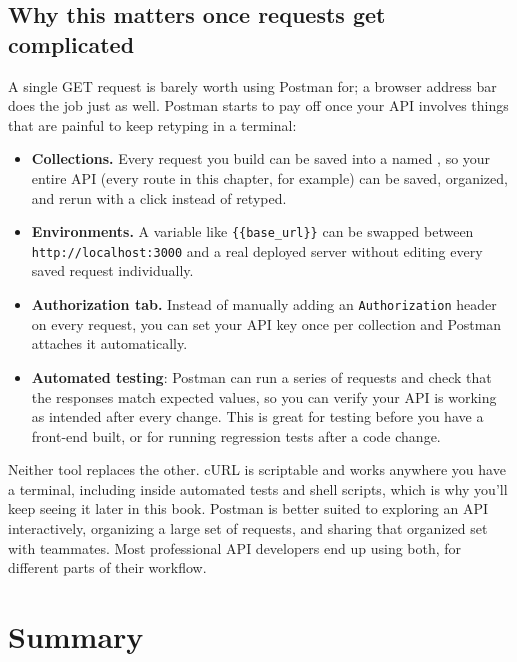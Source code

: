 \subsection{Why this matters once requests get complicated}
 
A single GET request is barely worth using Postman for; a browser
address bar does the job just as well. Postman starts to pay off once
your API involves things that are painful to keep retyping in a
terminal:
 
\begin{itemize}
  \item \textbf{Collections.} Every request you build can be saved into
        a named , so your entire API (every route in
        this chapter, for example) can be saved, organized, and rerun with
        a click instead of retyped.
  \item \textbf{Environments.} A variable like
        \texttt{\{\{base\_url\}\}} can be swapped between
        \texttt{http://localhost:3000} and a real deployed server without
        editing every saved request individually.
  \item \textbf{Authorization tab.} Instead of manually adding an
        \texttt{Authorization} header on every request, you can set your
        API key once per collection and Postman attaches it automatically.
  \item \textbf{Automated testing}: Postman can run a series of requests and check that the responses
        match expected values, so you can verify your API is working as
        intended after every change. This is great for testing before you have a front-end built, or for running regression tests after a code change.
\end{itemize}
 
Neither tool replaces the other. cURL is scriptable and works anywhere
you have a terminal, including inside automated tests and shell
scripts, which is why you'll keep seeing it later in this book. Postman
is better suited to exploring an API interactively, organizing a large
set of requests, and sharing that organized set with teammates. Most
professional API developers end up using both, for different parts of
their workflow.

\section{Summary}

